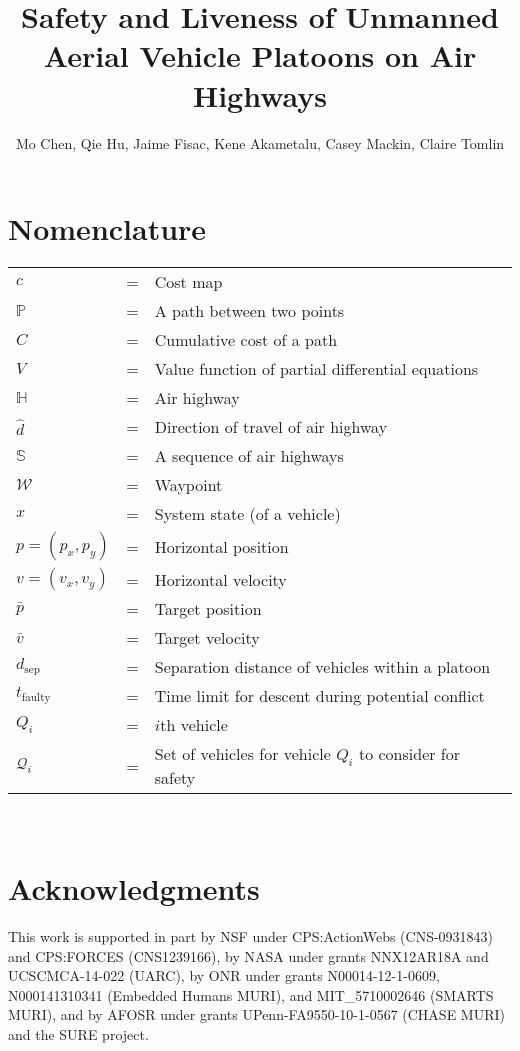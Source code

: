 \documentclass[submit]{aiaa-pretty}
\author{Mo Chen, Qie Hu, Jaime Fisac, Kene Akametalu, Casey Mackin, Claire Tomlin}
\title{Safety and Liveness of Unmanned Aerial Vehicle Platoons on Air Highways}
\newcommand{\pos}{p} %
\newcommand{\Pos}{\bar{p}} %
\newcommand{\vel}{v} %
\newcommand{\Vel}{\bar{v}} %
\newcommand{\hw}{\mathbb{H}} %
\newcommand{\hws}{\mathbb{S}} %
\newcommand{\hwd}{\hat{d}}
\newcommand{\wpt}{\mathcal{W}}
\newcommand{\cmap}{c}
\newcommand{\ccost}{C}
\newcommand{\ppath}{\mathbb{P}}
\newcommand{\ocost}{V}
\newcommand{\sepdist}{d_\text{sep}} %
\newcommand{\td}{t_\text{faulty}} %
\newcommand{\veh}[1]{Q_{#1}}
\newcommand{\vehSCS}[1]{\mathcal{Q}_{#1}} %
\begin{document}
\maketitle
\section*{Nomenclature}
\noindent\begin{tabular}{@{}lcl@{}}
$\cmap$ &=& Cost map \\
$\ppath$ &=& A path between two points \\
$\ccost$ &=& Cumulative cost of a path \\
$\ocost$ &=& Value function of partial differential equations \\
$\hw$ &=& Air highway \\
$\hwd$ &=& Direction of travel of air highway \\
$\hws$ &=& A sequence of air highways \\
$\wpt$ &=& Waypoint \\
$x$ &=& System state (of a vehicle) \\
$\pos=(\pos_x, \pos_y)$ &=& Horizontal position \\
$\vel=(\vel_x, \vel_y)$ &=& Horizontal velocity \\
$\Pos$ &=& Target position \\
$\Vel$ &=& Target velocity \\
$\sepdist$ &=& Separation distance of vehicles within a platoon \\
$\td$ &=& Time limit for descent during potential conflict \\
$\veh{i}$ &=& $i$th vehicle \\
$\vehSCS{i}$ &=& Set of vehicles for vehicle $\veh{i}$ to consider for safety 
\end{tabular} \\
















\section*{Acknowledgments}
This work is supported in part by NSF under CPS:ActionWebs (CNS-0931843) and CPS:FORCES (CNS1239166), by NASA under grants NNX12AR18A and UCSCMCA-14-022 (UARC), by ONR under grants N00014-12-1-0609, N000141310341 (Embedded Humans MURI), and MIT\_5710002646 (SMARTS MURI), and by AFOSR under grants UPenn-FA9550-10-1-0567 (CHASE MURI) and the SURE project.



\end{document}

